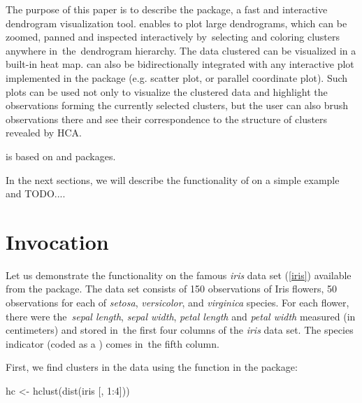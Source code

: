 \documentclass[article]{jss}
\newcommand{\myemph}[1]{\emph{#1}}
\newcommand{\Rfunction}[1]{\code{#1}}
\begin{document}
The purpose of this paper is to describe the  package, a
fast and interactive dendrogram visualization tool. 
 enables to plot large dendrograms, which can be zoomed,
panned and inspected interactively by~selecting and coloring clusters
anywhere in~the~dendrogram hierarchy.
The data clustered can be visualized in a built-in heat map. 
 can also be bidirectionally integrated
with any interactive plot implemented in the  package
(e.g. scatter plot, or parallel coordinate plot). 
Such plots can be used not only to visualize the clustered data and
highlight the observations forming the currently selected clusters, but
the user can also brush observations there and see their
correspondence to the structure of clusters revealed by HCA.

 is based on  and  packages.

In the next sections, we will describe the functionality of
 on a simple example and TODO....


\section[idendro Invocation]{\Rfunction{idendro} Invocation}

Let us demonstrate the  functionality on the famous
\myemph{iris} data set (\ref{iris}) available from the 
 package. The data set consists of 150 observations
of Iris flowers, 50 observations for each of \emph{setosa}, \emph{versicolor}, and
\emph{virginica} species. For each flower, there were 
the~\myemph{sepal length}, \myemph{sepal width}, \myemph{petal length}
and \myemph{petal width} measured (in centimeters)
and stored in~the first four columns of the \myemph{iris} data set. 
The species indicator (coded as a ) comes in~the fifth
column.

First, we find clusters in the data using the  function in
the  package: 

\begin{Code}
    hc <- hclust(dist(iris [, 1:4]))
\end{Code}
\end{document}
